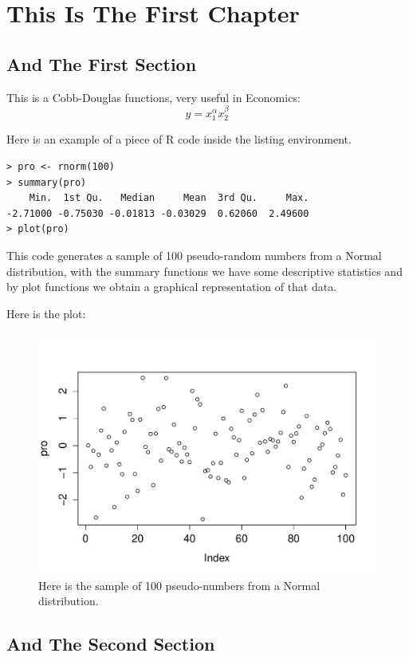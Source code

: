 \chapter{This Is The First Chapter}
\section{And The First Section}
This is a Cobb-Douglas functions, very useful in Economics:
\begin{equation}
	y = x_{1}^{\alpha}x_{2}^{\beta}
\end{equation}

Here is an example of a piece of R code inside the listing environment.
\begin{lstlisting}
> pro <- rnorm(100)
> summary(pro)
    Min.  1st Qu.   Median     Mean  3rd Qu.     Max. 
-2.71000 -0.75030 -0.01813 -0.03029  0.62060  2.49600 
> plot(pro)
\end{lstlisting}
This code generates a sample of 100 pseudo-random numbers from a Normal distribution, with the summary functions we have some descriptive statistics and by plot functions we obtain a graphical representation of that data.

Here is the plot:
\begin{figure}[th]
	\centering
	\includegraphics[width=\textwidth]{pictures/Rplot.pdf} 
	\caption[Sample from a Normal]{Here is the sample of 100 pseudo-numbers 	from a Normal distribution.}
\end{figure}
\section{And The Second Section}
\lipsum
